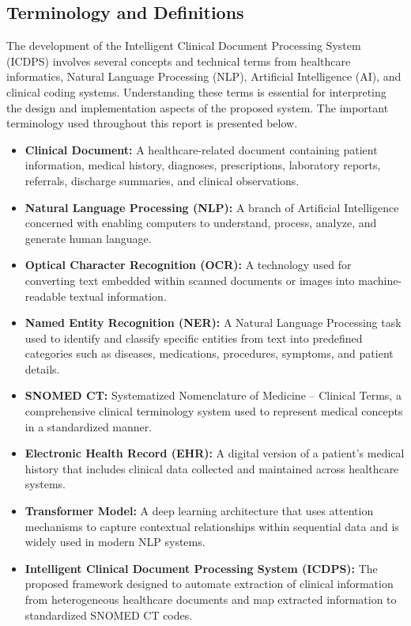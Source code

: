 \subsection[Terminology and Definitions]
{\textbf{Terminology and Definitions}}

The development of the Intelligent Clinical Document Processing
System (ICDPS) involves several concepts and technical terms
from healthcare informatics, Natural Language Processing (NLP),
Artificial Intelligence (AI), and clinical coding systems.
Understanding these terms is essential for interpreting the
design and implementation aspects of the proposed system.
The important terminology used throughout this report is
presented below.

\begin{itemize}

\item \textbf{Clinical Document:}
A healthcare-related document containing patient information,
medical history, diagnoses, prescriptions, laboratory reports,
referrals, discharge summaries, and clinical observations.

\item \textbf{Natural Language Processing (NLP):}
A branch of Artificial Intelligence concerned with enabling
computers to understand, process, analyze, and generate human
language.

\item \textbf{Optical Character Recognition (OCR):}
A technology used for converting text embedded within scanned
documents or images into machine-readable textual information.

\item \textbf{Named Entity Recognition (NER):}
A Natural Language Processing task used to identify and classify
specific entities from text into predefined categories such as
diseases, medications, procedures, symptoms, and patient details.

\item \textbf{SNOMED CT:}
Systematized Nomenclature of Medicine -- Clinical Terms,
a comprehensive clinical terminology system used to represent
medical concepts in a standardized manner.

\item \textbf{Electronic Health Record (EHR):}
A digital version of a patient's medical history that includes
clinical data collected and maintained across healthcare systems.

\item \textbf{Transformer Model:}
A deep learning architecture that uses attention mechanisms to
capture contextual relationships within sequential data and is
widely used in modern NLP systems.

\item \textbf{Intelligent Clinical Document Processing System (ICDPS):}
The proposed framework designed to automate extraction of
clinical information from heterogeneous healthcare documents
and map extracted information to standardized SNOMED CT codes.

\end{itemize}

